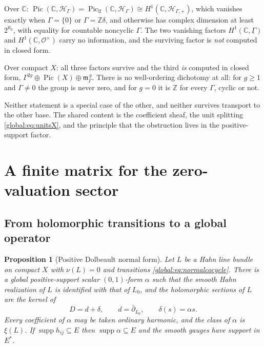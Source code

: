 \documentclass[11pt,letterpaper]{article}
\newtheorem{proposition}[proposition]{Proposition}
\theoremstyle{definition}
\theoremstyle{remark}
\newcommand{\C}{\mathbb C}
\newcommand{\Z}{\mathbb Z}
\newcommand{\OO}{\mathcal O}
\newcommand{\HH}{\mathscr H_\Gamma}
\newcommand{\HP}{\mathscr H_{\Gamma,+}}
\newcommand{\mK}{\mathfrak m_\Gamma}
\newcommand{\supp}{\operatorname{supp}}
\newcommand{\Pic}{\operatorname{Pic}}
\newcommand{\Piclf}{\operatorname{Pic}_{\mathrm{lf}}}
\numberwithin{equation}{section}
\begin{document}
Over $\C$: $\Pic(\C,\HH)=\Piclf(\C,\HH)\cong H^1(\C,\HP)$, which vanishes exactly when $\Gamma=\{0\}$ or $\Gamma=\Z\delta$, and otherwise has complex dimension at least $2^{\aleph_0}$, with equality for countable noncyclic $\Gamma$. The two vanishing factors $H^1(\C,\underline\Gamma)$ and $H^1(\C,\OO^\times)$ carry no information, and the surviving factor is \emph{not} computed in closed form.

Over compact $X$: all three factors survive and the third \emph{is} computed in closed form, $\Gamma^{2g}\oplus\Pic(X)\oplus\mK^{\,g}$. There is no well-ordering dichotomy at all: for $g\ge1$ and $\Gamma\ne0$ the group is never zero, and for $g=0$ it is $\Z$ for every $\Gamma$, cyclic or not.

Neither statement is a special case of the other, and neither survives transport to the other base. The shared content is the coefficient sheaf, the unit splitting \eqref{global:eq:unitsX}, and the principle that the obstruction lives in the positive-support factor.

\section{A finite matrix for the zero-valuation sector}\label{global:sec:finitematrix}

\subsection{From holomorphic transitions to a global operator}

\begin{proposition}[Positive Dolbeault normal form]\label{global:prop:normalform}
Let $L$ be a Hahn line bundle on compact $X$ with $\nu(L)=0$ and transitions \eqref{global:eq:normalcocycle}. There is a global positive-support scalar $(0,1)$-form $\alpha$ such that the smooth Hahn realization of $L$ is identified with that of $L_0$, and the holomorphic sections of $L$ are the kernel of
\begin{equation}\label{global:eq:D}
  D=d+\delta,\qquad d=\bar\partial_{L_0},\qquad \delta(s)=\alpha s .
\end{equation}
Every coefficient of $\alpha$ may be taken ordinary harmonic, and the class of $\alpha$ is $\xi(L)$. If $\supp h_{ij}\subseteq E$ then $\supp\alpha\subseteq E$ and the smooth gauges have support in $E^*$.
\end{proposition}
\end{document}

